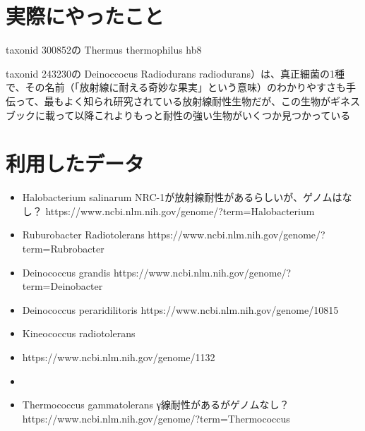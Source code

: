 \documentclass[a4j,12pt]{jreport}
\begin{document}
\section{実際にやったこと}
taxonid 300852の
Thermus thermophilus hb8

taxonid 243230の
Deinoccocus Radiodurans radiodurans）は、真正細菌の1種で、その名前（「放射線に耐える奇妙な果実」という意味）のわかりやすさも手伝って、最もよく知られ研究されている放射線耐性生物だが、この生物がギネスブックに載って以降これよりもっと耐性の強い生物がいくつか見つかっている


\section{利用したデータ}
    \begin{itemize}
        \item Halobacterium salinarum
        NRC-1が放射線耐性があるらしいが、ゲノムはなし？
        https://www.ncbi.nlm.nih.gov/genome/?term=Halobacterium%

        \item Ruburobacter Radiotolerans
        https://www.ncbi.nlm.nih.gov/genome/?term=Rubrobacter%
        
        \item Deinococcus grandis
        https://www.ncbi.nlm.nih.gov/genome/?term=Deinobacter%
        \item Deinococcus peraridilitoris
        https://www.ncbi.nlm.nih.gov/genome/10815

        \item Kineococcus radiotolerans
        \item https://www.ncbi.nlm.nih.gov/genome/1132
        \item 


        \item Thermococcus gammatolerans
        γ線耐性があるがゲノムなし？
        https://www.ncbi.nlm.nih.gov/genome/?term=Thermococcus%

    \end{itemize}
\end{document}
